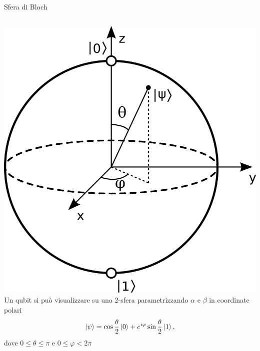 \documentclass{beamer}
\begin{document}
    \begin{frame}{Sfera di Bloch}
        \begin{columns}
            \includegraphics[width=\textwidth]{gfx/Bloch_sphere.png}
            Un qubit si può visualizzare su una 2-sfera parametrizzando $\alpha$ e $\beta$ in coordinate polari
            \begin{equation*}
                \ket{\psi} = \cos \frac{\theta}{2} \ket{0} + e^{i\varphi}\sin \frac{\theta}{2} \ket{1},
            \end{equation*}
            dove $0\leq\theta\leq\pi$ e $0\leq\varphi<2\pi$
        \end{columns}
    \end{frame}
\end{document}
